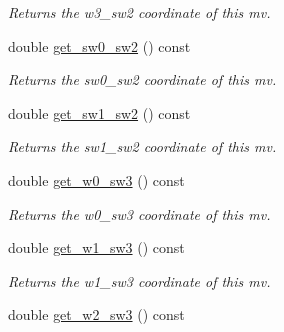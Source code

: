 \begin{DoxyCompactItemize}
\begin{DoxyCompactList}\small\item\em Returns the w3\-\_\-sw2 coordinate of this mv. \end{DoxyCompactList}\item 
\hypertarget{classe3ga_1_1mv_a0845477fdf2e0ce9138f444dfb08c752}{double \hyperlink{classe3ga_1_1mv_a0845477fdf2e0ce9138f444dfb08c752}{get\-\_\-sw0\-\_\-sw2} () const }\label{classe3ga_1_1mv_a0845477fdf2e0ce9138f444dfb08c752}

\begin{DoxyCompactList}\small\item\em Returns the sw0\-\_\-sw2 coordinate of this mv. \end{DoxyCompactList}\item 
\hypertarget{classe3ga_1_1mv_a9b52f26a29551983e4f58679f9a834ce}{double \hyperlink{classe3ga_1_1mv_a9b52f26a29551983e4f58679f9a834ce}{get\-\_\-sw1\-\_\-sw2} () const }\label{classe3ga_1_1mv_a9b52f26a29551983e4f58679f9a834ce}

\begin{DoxyCompactList}\small\item\em Returns the sw1\-\_\-sw2 coordinate of this mv. \end{DoxyCompactList}\item 
\hypertarget{classe3ga_1_1mv_a7d590aa19756a89b65163412521381c3}{double \hyperlink{classe3ga_1_1mv_a7d590aa19756a89b65163412521381c3}{get\-\_\-w0\-\_\-sw3} () const }\label{classe3ga_1_1mv_a7d590aa19756a89b65163412521381c3}

\begin{DoxyCompactList}\small\item\em Returns the w0\-\_\-sw3 coordinate of this mv. \end{DoxyCompactList}\item 
\hypertarget{classe3ga_1_1mv_a66365f15eb3aa9dbbda4d4cf2ec99caa}{double \hyperlink{classe3ga_1_1mv_a66365f15eb3aa9dbbda4d4cf2ec99caa}{get\-\_\-w1\-\_\-sw3} () const }\label{classe3ga_1_1mv_a66365f15eb3aa9dbbda4d4cf2ec99caa}

\begin{DoxyCompactList}\small\item\em Returns the w1\-\_\-sw3 coordinate of this mv. \end{DoxyCompactList}\item 
\hypertarget{classe3ga_1_1mv_a69e120de5f90722fd929fd64fc271af0}{double \hyperlink{classe3ga_1_1mv_a69e120de5f90722fd929fd64fc271af0}{get\-\_\-w2\-\_\-sw3} () const }\label{classe3ga_1_1mv_a69e120de5f90722fd929fd64fc271af0}


\end{DoxyCompactItemize}
